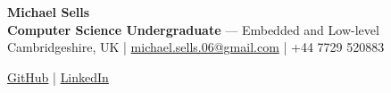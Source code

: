 \begin{center}
    {\Large\bfseries Michael Sells}\\[3pt]
    \textbf{Computer Science Undergraduate} --- Embedded and Low-level\\[3pt]
    Cambridgeshire, UK | 
    \href{mailto:michael.sells.06@gmail.com}{michael.sells.06@gmail.com} |
    +44 7729 520883
    
    \href{https://github.com/mike-sells-1306}{GitHub} |
    \href{http://www.linkedin.com/in/michael-sells-ms06}{LinkedIn}
    
\end{center}